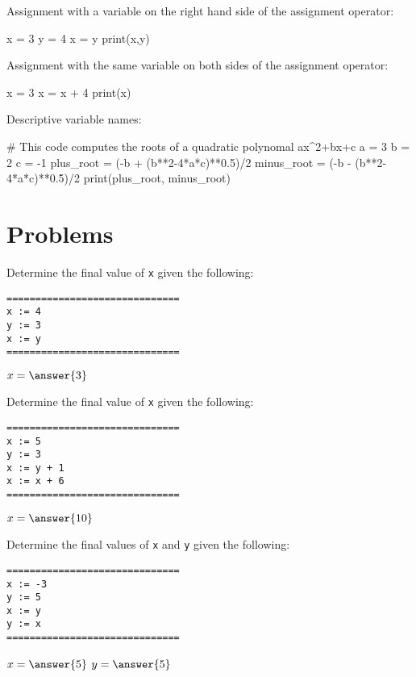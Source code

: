 \documentclass{ximera}
\begin{document}
Assignment with a variable on the right hand side of the assignment operator:

\begin{sageCell}
x = 3
y = 4
x = y
print(x,y)
\end{sageCell}

Assignment with the same variable on both sides of the assignment operator:

\begin{sageCell}
x = 3
x = x + 4
print(x)
\end{sageCell}

Descriptive variable names:

\begin{sageCell}
# This code computes the roots of a quadratic polynomal ax^2+bx+c
a = 3
b = 2
c = -1
plus_root = (-b + (b**2-4*a*c)**0.5)/2
minus_root = (-b - (b**2-4*a*c)**0.5)/2
print(plus_root, minus_root)
\end{sageCell}

\section{Problems}

\begin{question}
	Determine the final value of \verb|x| given the following:
	\begin{verbatim}
==============================
x := 4
y := 3
x := y
==============================
	\end{verbatim}
	$x = \answer{3}$
\end{question}

\begin{question}
	Determine the final value of \verb|x| given the following:
	\begin{verbatim}
==============================
x := 5
y := 3
x := y + 1
x := x + 6
==============================
	\end{verbatim}   
	$x = \answer{10}$
\end{question}

\begin{question}
	Determine the final values of \verb|x| and \verb|y| given the following:
	\begin{verbatim}
==============================
x := -3
y := 5
x := y
y := x
==============================
	\end{verbatim}
	$x = \answer{5}$
	$y = \answer{5}$
\end{question}

\end{document}
